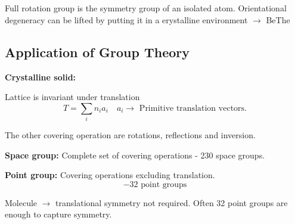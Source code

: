 \chapter[Lecture 10]{}\label{lec10}

Full rotation group is the symmetry group of an isolated atom. Orientational degeneracy can be lifted by putting it in a erystalline environment $\to$ BeThe

\section*{Application of Group Theory}

\noindent
{\bf Crystalline solid:}

Lattice is invariant under translation
$$
T=\sum\limits_{i}n_{i}a_{i}\quad a_{i}\to \text{ Primitive translation vectors.}
$$

The other covering operation are rotations, reflections and inversion.

\noindent
{\bf Space group:} Complete set of covering operations - 230 space groups.

\noindent
{\bf Point group:} Covering operations excluding translation.
$$
-32\text{ point groups}
$$

Molecule $\to$ translational symmetry not required. Often 32 point groups are enough to capture symmetry.


